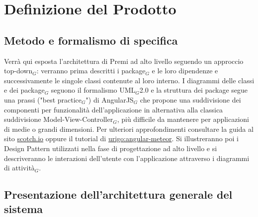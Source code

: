 \newpage
\section{Definizione del Prodotto}

\subsection{Metodo e formalismo di specifica}
Verrà qui esposta l'architettura di Premi ad alto livello seguendo un approccio top-down$_G$: verranno prima descritti i package$_G$ e le loro dipendenze e successivamente le singole classi contenute al loro interno. I diagrammi delle classi e dei package$_G$ seguono il formalismo UML$_G$2.0 e la struttura dei package segue una prassi ("best practice$_G$") di AngularJS$_G$ che propone una suddivisione dei componenti per funzionalità dell'applicazione in alternativa alla classica suddivisione Model-View-Controller$_G$, più difficile da mantenere per applicazioni di medie o grandi dimensioni. Per ulteriori approfondimenti consultare la guida al sito \href{https://scotch.io/tutorials/angularjs-best-practices-directory-structure}{scotch.io} oppure il tutorial di \href{http://angular-meteor.com/tutorial/step_07}{urigo:angular-meteor}.
Si illustreranno poi i Design Pattern utilizzati nella fase di progettazione ad alto livello e si descriveranno le interazioni dell'utente con l'applicazione attraverso i diagrammi di attività$_G$.


\subsection{Presentazione dell'architettura generale del sistema}

